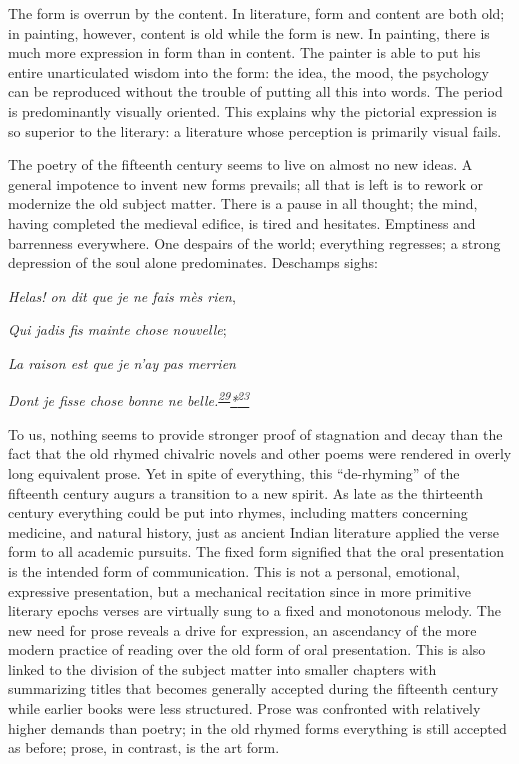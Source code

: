 The form is overrun by the content. In literature, form and content are
both old; in painting, however, content is old while the form is new. In
painting, there is much more expression in form than in content. The
painter is able to put his entire unarticulated wisdom into the form:
the idea, the mood, the psychology can be reproduced without the trouble
of putting all this into words. The period is predominantly visually
oriented. This explains why the pictorial expression is so superior to
the literary: a literature whose perception is primarily visual fails.

\protect\hypertarget{21_Chapter_Thirteen__IMAGE_AND_WORD.xhtmlux5cux23page_354}{}{}The
poetry of the fifteenth century seems to live on almost no new ideas. A
general impotence to invent new forms prevails; all that is left is to
rework or modernize the old subject matter. There is a pause in all
thought; the mind, having completed the medieval edifice, is tired and
hesitates. Emptiness and barrenness everywhere. One despairs of the
world; everything regresses; a strong depression of the soul alone
predominates. Deschamps sighs:

\emph{Helas! on dit que je ne fais mès rien},

\emph{Qui jadis fis mainte chose nouvelle};

\emph{La raison est que je n'ay pas merrien}

\emph{Dont je fisse chose bonne ne
belle.\textsuperscript{\protect\hypertarget{21_Chapter_Thirteen__IMAGE_AND_WORD.xhtmlux5cux23id_252}{\protect\hyperlink{23_NOTES.xhtmlux5cux23id_253}{29}}}\protect\hypertarget{21_Chapter_Thirteen__IMAGE_AND_WORD.xhtmlux5cux23id_2739}{\protect\hyperlink{23_NOTES.xhtmlux5cux23id_2740}{*\textsuperscript{23}}}}

To us, nothing seems to provide stronger proof of stagnation and decay
than the fact that the old rhymed chivalric novels and other poems were
rendered in overly long equivalent prose. Yet in spite of everything,
this ``de-rhyming'' of the fifteenth century augurs a transition to a
new spirit. As late as the thirteenth century everything could be put
into rhymes, including matters concerning medicine, and natural history,
just as ancient Indian literature applied the verse form to all academic
pursuits. The fixed form signified that the oral presentation is the
intended form of communication. This is not a personal, emotional,
expressive presentation, but a mechanical recitation since in more
primitive literary epochs verses are virtually sung to a fixed and
monotonous melody. The new need for prose reveals a drive for
expression, an ascendancy of the more modern practice of reading over
the old form of oral presentation. This is also linked to the division
of the subject matter into smaller chapters with summarizing titles that
becomes generally accepted during the fifteenth century while earlier
books were less structured. Prose was confronted with relatively higher
demands than poetry; in the old rhymed forms everything is still
accepted as before; prose, in contrast, is the art form.

